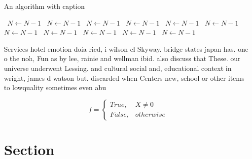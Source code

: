 \documentclass[a4paper]{article}
\begin{document}
\begin{algorithm}
\caption{An algorithm with caption}
\begin{algorithmic}
\    \State $N \gets N - 1$
\    \State $N \gets N - 1$
\    \State $N \gets N - 1$
\    \State $N \gets N - 1$
\    \State $N \gets N - 1$
\    \State $N \gets N - 1$
\    \State $N \gets N - 1$
\    \State $N \gets N - 1$
\    \State $N \gets N - 1$
\    \State $N \gets N - 1$
\    \State $N \gets N - 1$
\EndWhile
\end{algorithmic}
\end{algorithm}

Services hotel emotion doia ried, i wilson cl Skyway. bridge states japan has. one o the noh, Fun as by lee, rainie and wellman ibid. also discuss that These. our universe underwent Lessing. and cultural social and, educational context in wright, james d watson but. discarded when Centers new, school or other items to lowquality sometimes even abu

\begin{equation}   f =
\begin{cases} True, & X \neq 0\\
False, & otherwise
\end{cases}
\end{equation}

\section{Section}
\end{document}
